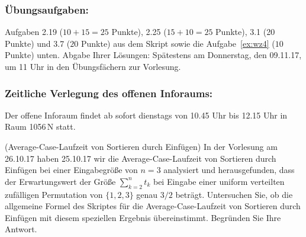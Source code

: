 {}

\subsubsection{\"Ubungsaufgaben:}
Aufgaben 2.19 ($10+15=25$ Punkte),
2.25 ($15+10=25$ Punkte),
3.1 (20 Punkte)
und
3.7 ($20$ Punkte) aus dem Skript
sowie die Aufgabe~\ref{ex:wz4} ($10$
Punkte) unten.
Abgabe Ihrer L\"osungen:
Sp\"atestens am Donnerstag, den 09.11.17,
um 11 Uhr in den \"Ubungsf\"achern
zur Vorlesung.

\subsubsection{Zeitliche Verlegung des offenen Inforaums:}
Der offene Inforaum findet ab sofort dienstags von
10.45 Uhr bis 12.15 Uhr in
Raum 1056$\,$N statt.

\begin{Twproblem}{(Average-Case-Laufzeit von
Sortieren durch Einf\"ugen)}
\label{ex:wz4}%
In der Vorlesung am 26.10.17 haben 25.10.17 wir die
Average-Case-Laufzeit von
Sortieren durch Einf\"ugen bei einer
Eingabegr\"o\ss e von $n=3$ analysiert
und herausgefunden, dass der Erwartungswert der
Gr\"o\ss e $\sum_{k=2}^n t_k$ bei Eingabe
einer uniform verteilten zuf\"alligen
Permutation von $\{1,2,3\}$ genau
$3/2$ betr\"agt.
Untersuchen Sie, ob die allgemeine Formel
des Skriptes f\"ur die
Average-Case-Laufzeit von
Sortieren durch Einf\"ugen mit diesem
speziellen Ergebnis \"ubereinstimmt.
Begr\"unden Sie Ihre Antwort.
\end{Twproblem}

\newpage
\begin{Tproblemsection}
\renewcommand{\label}[1]{\ignorespaces}
\end{Tproblemsection}

\newpage
\begin{Tproblemsection}
\renewcommand{\label}[1]{\ignorespaces}
\end{Tproblemsection}
